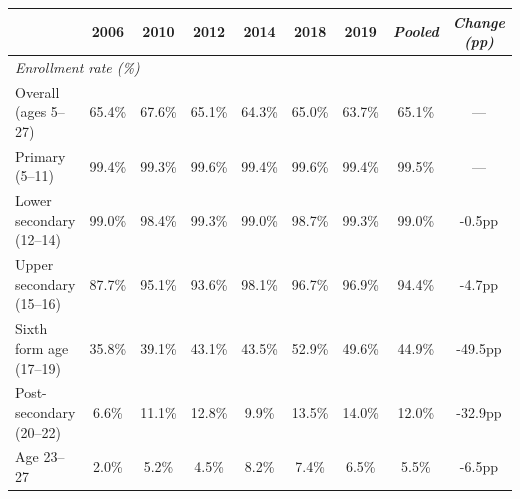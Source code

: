 \begin{tabular}{lcccccccc}
   \tabularnewline \midrule \midrule
 & 2006 & 2010 & 2012 & 2014 & 2018 & 2019 & \textit{Pooled} & \textit{Change (pp)} \\
\midrule
\multicolumn{9}{l}{\emph{Enrollment rate (\%)}} \\
Overall (ages 5--27) & 65.4\% & 67.6\% & 65.1\% & 64.3\% & 65.0\% & 63.7\% & 65.1\% & --- \\
\hspace{0.75em}Primary (5--11) & 99.4\% & 99.3\% & 99.6\% & 99.4\% & 99.6\% & 99.4\% & 99.5\% & --- \\
\hspace{0.75em}Lower secondary (12--14) & 99.0\% & 98.4\% & 99.3\% & 99.0\% & 98.7\% & 99.3\% & 99.0\% & -0.5pp \\
\hspace{0.75em}Upper secondary (15--16) & 87.7\% & 95.1\% & 93.6\% & 98.1\% & 96.7\% & 96.9\% & 94.4\% & -4.7pp \\
\hspace{0.75em}Sixth form age (17--19) & 35.8\% & 39.1\% & 43.1\% & 43.5\% & 52.9\% & 49.6\% & 44.9\% & -49.5pp \\
\hspace{0.75em}Post-secondary (20--22) & 6.6\% & 11.1\% & 12.8\% & 9.9\% & 13.5\% & 14.0\% & 12.0\% & -32.9pp \\
\hspace{0.75em}Age 23--27 & 2.0\% & 5.2\% & 4.5\% & 8.2\% & 7.4\% & 6.5\% & 5.5\% & -6.5pp \\
\bottomrule
\end{tabular}
